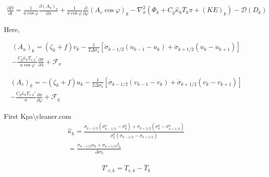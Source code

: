 \begin{eqnarray}
  \frac{\partial D}{\partial t} 
        =   \frac{1}{a\cos\varphi} 
            \frac{\partial (A_u)_k}{\partial \lambda}
          + \frac{1}{a\cos\varphi} 
            \frac{\partial }{\partial \varphi} (A_v \cos\varphi)_k
          - \nabla^{2}_{\sigma}
           ( \Phi_k + C_{p} \hat{\kappa}_k \bar{T}_k \pi 
             + ({\mathit KE})_k )
          - {\mathcal D}(D_k) 
\end{eqnarray}

Here,

\begin{eqnarray}
  (A_u)_k
    =  ( \zeta_k + f ) v_k 
             - \frac{1}{2 \Delta \sigma_k} 
             [   \dot{\sigma}_{k-1/2} ( u_{k-1} - u_k   )
               + \dot{\sigma}_{k+1/2} ( u_k   - u_{k+1} ) ]
            \\
           - \frac{C_{p} \hat{\kappa}_k T_{v,k}'}{a\cos\varphi} 
                  \frac{\partial \pi}{\partial \lambda} 
             + {\mathcal F}_x
\end{eqnarray}

\begin{eqnarray}
  (A_v)_k
    =  - ( \zeta_k + f ) u_k 
             - \frac{1}{2 \Delta \sigma_k} 
             [   \dot{\sigma}_{k-1/2} ( v_{k-1} - v_k   )
               + \dot{\sigma}_{k+1/2} ( v_k   - v_{k+1} ) ]
            \\
           - \frac{C_{p} \hat{\kappa}_k T_{v,k}'}{a} 
               \frac{\partial \pi}{\partial \varphi} 
             + {\mathcal F}_y
\end{eqnarray}

First Kpa\textbackslash cleaner\cleaner\cleaner.com \begin{eqnarray}
   \hat{\kappa}_k 
    =       \frac{  \sigma_{k-1/2}(   \sigma^{\kappa}_{k-1/2} 
                                    - \sigma^{\kappa}_k      ) 
                  + \sigma_{k+1/2}(   \sigma^{\kappa}_k 
                                    - \sigma^{\kappa}_{k+1/2}  ) }
                 { \sigma^{\kappa}_k
                     ( \sigma_{k-1/2} - \sigma_{k+1/2} )         } 
            \\
  =  \frac{ \sigma_{k-1/2} \alpha_k + \sigma_{k+1/2} \beta_k }
            { \Delta \sigma_k                                  } 
\end{eqnarray}

\begin{eqnarray}
T'_{v,k} = T_{v,k} - \bar{T}_k
\end{eqnarray}

